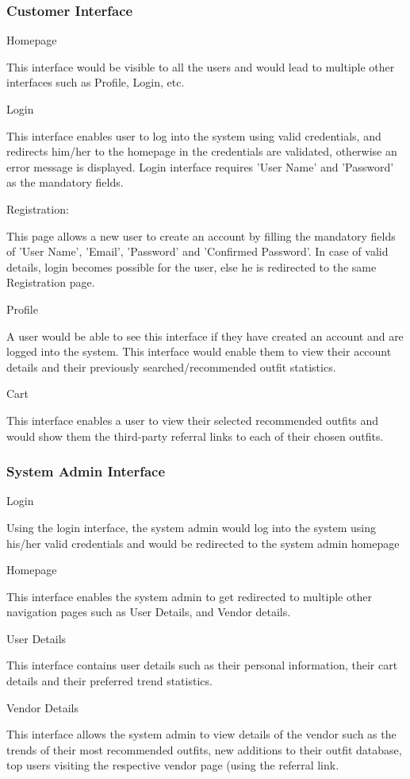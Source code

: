 \subsubsection{Customer Interface}

\begin{outline}
  \1 Homepage
  
  This interface would be visible to all the users and would lead to multiple other interfaces such as Profile, Login, etc. 
  
  \1 Login
  
  This interface enables user to log into the system using valid credentials, and redirects him/her to the homepage in the credentials are validated, otherwise an error message is displayed. Login interface requires 'User Name' and 'Password' as the mandatory fields. 
  
  \1 Registration:
  
  This page allows a new user to create an account by filling the mandatory fields of 'User Name', 'Email', 'Password' and 'Confirmed Password'. In case of valid details, login becomes possible for the user, else he is redirected to the same Registration page.
  
  \1 Profile
  
  A user would be able to see this interface if they have created an account and are logged into the system. This interface would enable them to view their account details and their previously searched/recommended outfit statistics.
  
  \1 Cart
  
  This interface enables a user to view their selected recommended outfits and would show them the third-party referral links to each of their chosen outfits. 
  
 \end{outline}
 \subsubsection{System Admin Interface}
 \begin{outline}
   \1 Login
   
   Using the login interface, the system admin would log into the system using his/her valid credentials and would be redirected to the system admin homepage
   
   \1 Homepage
   
   This interface enables the system admin to get redirected to multiple other navigation pages such as User Details, and Vendor details.
   
   \1 User Details
   
   This interface contains user details such as their personal information, their cart details and their preferred trend statistics.
   
   \1 Vendor Details
   
   This interface allows the system admin to view details of the vendor such as the trends of their most recommended outfits, new additions to their outfit database, top users visiting the respective vendor page (using the referral link.
   
 \end{outline}

